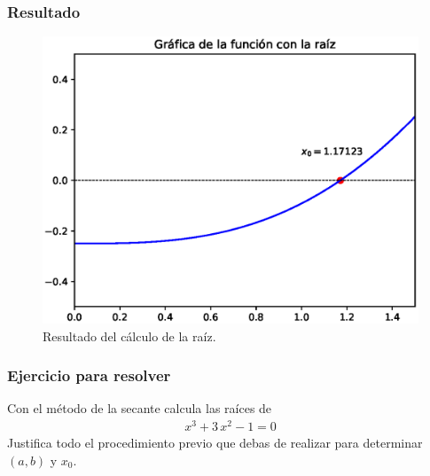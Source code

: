 \begin{frame}
\frametitle{Resultado}
\begin{figure}[h!]
	\centering
	\includegraphics[scale=0.5]{Imagenes/raices_secante_02.eps}
	\caption{Resultado del cálculo de la raíz.}
\end{figure}
\end{frame}
\begin{frame}
\frametitle{Ejercicio para resolver}
Con el método de la secante calcula las raíces de
\begin{align*}
x^{3} + 3 \, x^{2} - 1  = 0
\end{align*}
Justifica todo el procedimiento previo que debas de realizar para determinar $(a, b)$ y $x_{0}$.
\end{frame}
